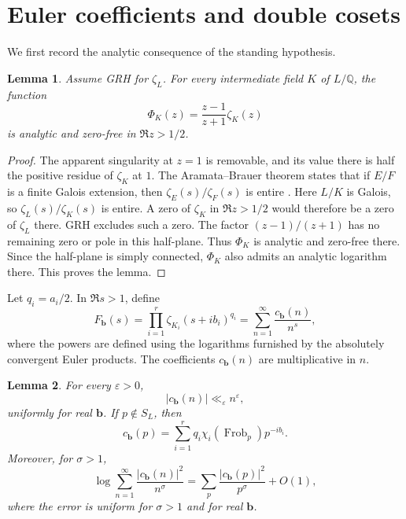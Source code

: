 \documentclass[11pt]{amsart}
\numberwithin{equation}{section}
\theoremstyle{plain}
\newtheorem{lem}{Lemma}[section]
\newcommand{\Q}{\mathbb{Q}}
\renewcommand{\epsilon}{\varepsilon}
\DeclareMathOperator{\Frob}{Frob}
\begin{document}
\section{Euler coefficients and double cosets}\label{sec:euler-coefficients}

We first record the analytic consequence of the standing hypothesis.

\begin{lem}\label{lem:regularised-zeta}
Assume GRH for $\zeta_L$.  For every intermediate field $K$ of $L/\Q$,
the function
\begin{equation}\label{eq:Phi-definition}
\Phi_K(z)=\frac{z-1}{z+1}\zeta_K(z)
\end{equation}
is analytic and zero-free in $\Re z>1/2$.
\end{lem}

\begin{proof}
The apparent singularity at $z=1$ is removable, and its value there is
half the positive residue of $\zeta_K$ at $1$.  The Aramata--Brauer theorem
states that if $E/F$ is a finite Galois extension, then
$\zeta_E(s)/\zeta_F(s)$ is entire \cite{Aramata,Brauer}.  Here $L/K$ is
Galois, so $\zeta_L(s)/\zeta_K(s)$ is entire.  A zero of
$\zeta_K$ in $\Re z>1/2$ would therefore be a zero of $\zeta_L$ there.
GRH excludes such a zero.  The factor $(z-1)/(z+1)$ has no remaining zero
or pole in this half-plane.  Thus $\Phi_K$ is analytic and zero-free there.
Since the half-plane is simply connected, $\Phi_K$ also admits an analytic
logarithm there.  This proves the lemma.
\end{proof}

Let $q_i=a_i/2$.  In $\Re s>1$, define
\begin{equation}\label{eq:F-dirichlet-series}
F_{\mathbf b}(s)
=\prod_{i=1}^r\zeta_{K_i}(s+ib_i)^{q_i}
=\sum_{n=1}^{\infty}\frac{c_{\mathbf b}(n)}{n^s},
\end{equation}
where the powers are defined using the logarithms furnished by the
absolutely convergent Euler products.  The coefficients
$c_{\mathbf b}(n)$ are multiplicative in $n$.

\begin{lem}\label{lem:coefficient-bounds}
For every $\epsilon>0$,
\begin{equation*}
|c_{\mathbf b}(n)|\ll_{\epsilon}n^{\epsilon},
\end{equation*}
uniformly for real $\mathbf b$.  If $p\notin S_L$, then
\begin{equation}\label{eq:first-prime-coefficient}
c_{\mathbf b}(p)=
\sum_{i=1}^r q_i\chi_i(\Frob_p)p^{-ib_i}.
\end{equation}
Moreover, for $\sigma>1$,
\begin{equation}\label{eq:square-euler-series}
\log\sum_{n=1}^{\infty}
\frac{|c_{\mathbf b}(n)|^2}{n^\sigma}
=\sum_p\frac{|c_{\mathbf b}(p)|^2}{p^\sigma}+O(1),
\end{equation}
where the error is uniform for $\sigma>1$ and for real
$\mathbf b$.
\end{lem}
\end{document}
